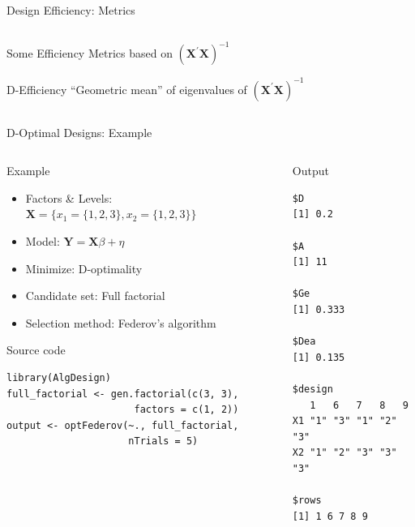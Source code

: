 \documentclass[10pt, compress, aspectratio=169, xcolor={table,usenames,dvipsnames}]{beamer}
\begin{document}
\begin{frame}[label={sec:orgebaf679}]{Design Efficiency: Metrics}
\begin{columns}
\begin{column}{0.5\columnwidth}
\begin{block}{Some Efficiency Metrics based on \(\left(\bm{X}^{\prime}\bm{X}\right)^{-1}\)}
\begin{block}{D-Efficiency}
\vspace{-.3cm}
\colorbox{Accent!25}{``Geometric mean'' of eigenvalues of \(\left(\bm{X}^{\prime}\bm{X}\right)^{-1}\)}
\end{block}
\end{block}
\end{column}
\end{columns}
\end{frame}
\begin{frame}[fragile,label={sec:org91975c4}]{D-Optimal Designs: Example}
 \begin{columns}
\begin{column}{0.5\columnwidth}
\begin{block}{Example}
\begin{itemize}
\item Factors \& Levels: \(\mathbf{X} = \{x_1 = \{1, 2, 3\}, x_2 = \{1, 2, 3\}\}\)
\item Model: \(\mathbf{Y} = \mathbf{X}\beta + \eta\)
\item Minimize: \alert{D-optimality}
\item Candidate set: \alert{Full factorial}
\item Selection method: \alert{Federov's algorithm}
\end{itemize}

\begin{block}{Source code}
\lstset{language=r,label= ,caption= ,captionpos=b,numbers=none}
\begin{lstlisting}
library(AlgDesign)
full_factorial <- gen.factorial(c(3, 3),
                      factors = c(1, 2))
output <- optFederov(~., full_factorial,
                     nTrials = 5)
\end{lstlisting}
\end{block}
\end{block}
\end{column}

\begin{column}{0.5\columnwidth}
\begin{block}{Output}
\scriptsize

\begin{verbatim}
$D
[1] 0.2

$A
[1] 11

$Ge
[1] 0.333

$Dea
[1] 0.135

$design
   1   6   7   8   9  
X1 "1" "3" "1" "2" "3"
X2 "1" "2" "3" "3" "3"

$rows
[1] 1 6 7 8 9
\end{verbatim}

\normalsize
\end{block}
\end{column}
\end{columns}
\end{frame}
\end{document}
